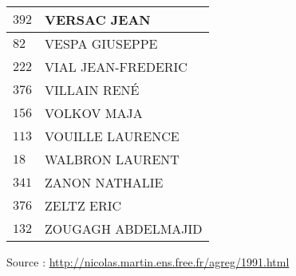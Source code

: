 \begin{xltabular}{\linewidth}{|l|X|}
    \hline
    $392$ & VERSAC JEAN \\
    \hline
    $82$ & VESPA GIUSEPPE \\
    \hline
    $222$ & VIAL JEAN-FREDERIC \\
    \hline
    $376$ & VILLAIN RENÉ \\
    \hline
    $156$ & VOLKOV MAJA \\
    \hline
    $113$ & VOUILLE LAURENCE \\
    \hline
    $18$ & WALBRON LAURENT \\
    \hline
    $341$ & ZANON NATHALIE \\
    \hline
    $376$ & ZELTZ ERIC \\
    \hline
    $132$ & ZOUGAGH ABDELMAJID \\
    \hline
  \end{xltabular}

  \begin{flushright}
    {\tiny Source : \url{http://nicolas.martin.ens.free.fr/agreg/1991.html}}
  \end{flushright}

